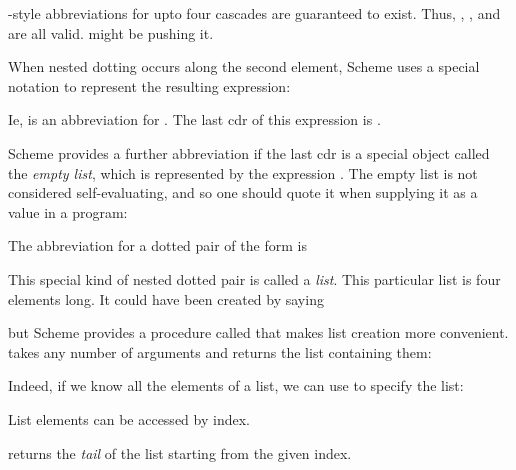 {\n {}-style abbreviations for upto four cascades are
guaranteed to exist.  Thus, , , and
 are all valid.   might be pushing it.

When nested dotting occurs along the second element,
Scheme uses a special notation to represent the
resulting expression:


\n Ie,  is an abbreviation for .  The last cdr of this
expression is .


Scheme provides a further abbreviation if the last cdr
is a special object called the {\em empty list}, which
is represented by the expression \q{()}.  The empty
list is not considered self-evaluating, and so one
should quote it when supplying it as a value in a
program:


\n The abbreviation for a dotted pair of the form  is


\n 
{}
This special kind of nested dotted pair is called a
{\em list}.  This particular list is four elements
long.  It could have been created by saying


\n but Scheme provides a procedure called  that
makes list creation more convenient.   takes
any number of arguments and returns the list containing
them:


Indeed, if we know all the elements of a list, we can use
 to specify the list:


\n 
{}
List elements can be accessed by index.


\n {} returns the {\em tail} of the list
starting from the given index.

}
